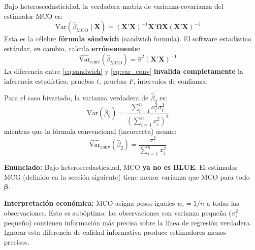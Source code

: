 \documentclass[12pt,a4paper]{report}
\theoremstyle{definition}
\theoremstyle{remark}
\newcommand{\Var}{\mathrm{Var}}
\newcommand{\betahat}{\hat{\beta}}
\newcommand{\sigmahat}{\hat{\sigma}}
\newcommand{\OLS}{\text{MCO}}
\begin{document}
\begin{tcolorbox}[alertastyle, title={Resultado Crítico: Fórmula de Varianza Incorrecta}]
  Bajo heteroscedasticidad, la verdadera matriz de varianza-covarianza del estimador MCO es:
  \begin{equation}
    \Var(\betahat_{\OLS} \mid \mathbf{X}) = (\mathbf{X}'\mathbf{X})^{-1}\mathbf{X}'\boldsymbol{\Omega}\mathbf{X}(\mathbf{X}'\mathbf{X})^{-1}
    \label{eq:sandwich}
  \end{equation}
  Esta es la célebre \textbf{fórmula sándwich} (sandwich formula). El software estadístico estándar, en cambio, calcula \textbf{erróneamente}:
  \begin{equation}
    \widehat{\Var}_{\text{conv}}(\betahat_{\OLS}) = \sigmahat^2 (\mathbf{X}'\mathbf{X})^{-1}
    \label{eq:var_conv}
  \end{equation}
  La diferencia entre \eqref{eq:sandwich} y \eqref{eq:var_conv} \textbf{invalida completamente} la inferencia estadística: pruebas $t$, pruebas $F$, intervalos de confianza.
\end{tcolorbox}

Para el caso bivariado, la varianza verdadera de $\betahat_2$ es:
\begin{equation}
  \Var(\betahat_2) = \frac{\sum_{i=1}^n x_i^2 \sigma_i^2}{\left(\sum_{i=1}^n x_i^2\right)^2}
  \label{eq:var_beta2_true}
\end{equation}
mientras que la fórmula convencional (incorrecta) asume:
\begin{equation}
  \widehat{\Var}_{\text{conv}}(\betahat_2) = \frac{\sigma^2}{\sum_{i=1}^n x_i^2}
  \label{eq:var_beta2_conv}
\end{equation}

\begin{tcolorbox}[teoremastyle, title={Teorema 11.2: Ineficiencia de MCO -- Gauss-Markov Modificado}]
  \textbf{Enunciado:} Bajo heteroscedasticidad, MCO \textbf{ya no es BLUE}. El estimador MCG (definido en la sección siguiente) tiene menor varianza que MCO para todo $\boldsymbol{\beta}$.

  \textbf{Interpretación económica:} MCO asigna pesos iguales $w_i = 1/n$ a todas las observaciones. Esto es subóptimo: las observaciones con varianza pequeña ($\sigma_i^2$ pequeño) contienen información más precisa sobre la línea de regresión verdadera. Ignorar esta diferencia de calidad informativa produce estimadores menos precisos.
\end{tcolorbox}
\end{document}
